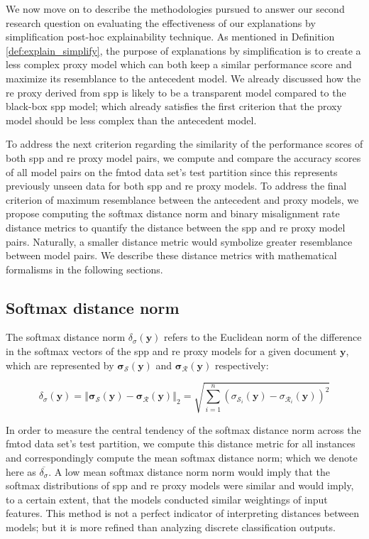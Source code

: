 We now move on to describe the methodologies pursued to answer our second
research question on evaluating the effectiveness of our explanations by
simplification post-hoc explainability technique. As mentioned in Definition
\ref{def:explain_simplify}, the purpose of explanations by simplification is to
create a less complex proxy model which can both keep a similar performance
score and maximize its resemblance to the antecedent model. We already discussed
how the \ac{re} proxy derived from \ac{spp} is likely to be a transparent model
compared to the black-box \ac{spp} model; which already satisfies the first
criterion that the proxy model should be less complex than the antecedent model.

To address the next criterion regarding the similarity of the performance scores
of both \ac{spp} and \ac{re} proxy model pairs, we compute and compare the accuracy
scores of all model pairs on the \ac{fmtod} data set's test partition since this
represents previously unseen data for both \ac{spp} and \ac{re} proxy models. To
address the final criterion of maximum resemblance between the antecedent and
proxy models, we propose computing the softmax distance norm and binary
misalignment rate distance metrics to quantify the distance between the \ac{spp}
and \ac{re} proxy model pairs. Naturally, a smaller distance metric would symbolize
greater resemblance between model pairs. We describe these distance metrics with
mathematical formalisms in the following sections.

\subsection{Softmax distance norm}

The softmax distance norm $\delta_{\sigma}(\bm{y})$ refers to the Euclidean norm
of the difference in the softmax vectors of the \ac{spp} and \ac{re} proxy models for a
given document $\bm{y}$, which are represented by
$\bm{\sigma_{\mathcal{S}}}(\bm{y})$ and $\bm{\sigma_{\mathcal{R}}}(\bm{y})$
respectively:

\begin{equation}
  \delta_{\sigma}(\bm{y}) = \left\Vert \bm{\sigma_{\mathcal{S}}}(\bm{y}) - \bm{\sigma_{\mathcal{R}}}(\bm{y}) \right\Vert_{2} = \sqrt{\sum^n_{i=1} (\sigma_{\mathcal{S}_i}(\bm{y}) - \sigma_{\mathcal{R}_i}(\bm{y}))^2} 
\end{equation}

In order to measure the central tendency of the softmax distance norm across the
\ac{fmtod} data set's test partition, we compute this distance metric for all
instances and correspondingly compute the mean softmax distance norm; which we
denote here as $\overline{\delta_{\sigma}}$. A low mean softmax distance norm
norm would imply that the softmax distributions of \ac{spp} and \ac{re} proxy models
were similar and would imply, to a certain extent, that the models conducted
similar weightings of input features. This method is not a perfect indicator of
interpreting distances between models; but it is more refined than analyzing
discrete classification outputs.

